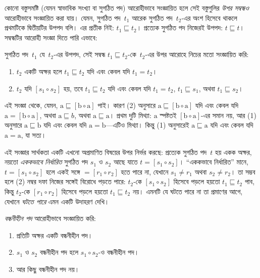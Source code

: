 \documentclass[../../../include/open-logic-section]{subfiles}
\begin{document}


কোনো বস্তুসমষ্টি (যেমন স্বাভাবিক সংখ্যা বা সুগঠিত পদ)
আরোহীভাবে সংজ্ঞায়িত হলে সেই বস্তুগুলির \emph{উপর সম্বন্ধও}
আরোহীভাবে সংজ্ঞায়িত করা যায়। যেমন, সুগঠিত পদ~$t_1$
আরেক সুগঠিত পদ~$t_2$-এর অংশ হিসেবে থাকলে প্রথমটিকে
দ্বিতীয়টির উপপদ বলি। এর প্রতীক নিই: $t_1 \sqsubseteq t_2$।
প্রত্যেক সুগঠিত পদ নিজেরই উপপদ: $t \sqsubseteq t$।
সম্বন্ধটির আরোহী সংজ্ঞা দিতে পারি এভাবে:

\begin{defn}
  সুগঠিত পদ~$t_1$ যে~$t_2$-এর উপপদ, সেই সম্বন্ধ
  $t_1 \sqsubseteq t_2$-কে~$t_2$-এর উপর আরোহে
  নিচের মতো সংজ্ঞায়িত করি:
  \begin{enumerate}
  \item $t_2$ একটি অক্ষর হলে $t_1 \sqsubseteq t_2$
    যদি এবং কেবল যদি $t_1 = t_2$।
  \item $t_2$ যদি $[s_1 \circ s_2]$ হয়, তবে
    $t_1 \sqsubseteq t_2$ যদি এবং কেবল যদি $t_1 =
    t_2$, $t_1 \sqsubseteq s_1$, অথবা $t_1 \sqsubseteq s_2$।
  \end{enumerate}
\end{defn}

এই সংজ্ঞা থেকে, যেমন, $\mathrm{a}
\sqsubseteq [\mathrm{b} \circ \mathrm{a}]$ পাই। কারণ
(2) অনুসারে $\mathrm{a} \sqsubseteq [\mathrm{b} \circ
\mathrm{a}]$ যদি এবং কেবল যদি $\mathrm{a}
= [\mathrm{b} \circ \mathrm{a}]$, অথবা $\mathrm{a}
\sqsubseteq b$, অথবা $\mathrm{a} \sqsubseteq \mathrm{a}$।
প্রথম দুটি মিথ্যা: $\mathrm{a}$ স্পষ্টতই $[\mathrm{b}
\circ \mathrm{a}]$-এর সমান নয়, আর (1) অনুসারে
$\mathrm{a} \sqsubseteq \mathrm{b}$ যদি এবং কেবল যদি
$\mathrm{a} = \mathrm{b}$—এটিও মিথ্যা। কিন্তু (1) অনুসারেই
$\mathrm{a} \sqsubseteq \mathrm{a}$ যদি এবং কেবল যদি
$\mathrm{a} = \mathrm{a}$, যা সত্য।

এই সংজ্ঞার সার্থকতা একটি এখনো অপ্রমাণিত বিষয়ের উপর
নির্ভর করছে: প্রত্যেক সুগঠিত পদ~$t$ হয় একক অক্ষর,
নয়তো \emph{এককভাবে নির্ধারিত} সুগঠিত পদ $s_1$ ও $s_2$
আছে যাতে $t = [s_1 \circ s_2]$। ``এককভাবে নির্ধারিত''
মানে, $t = [s_1 \circ s_2]$ হলে একই সঙ্গে
$= [r_1 \circ r_2]$ হতে পারে না, যেখানে $s_1 \neq r_1$
অথবা $s_2 \neq r_2$। তা সম্ভব হলে (2) নম্বর দফা
নিজের সঙ্গেই বিরোধে পড়তে পারে: $t_2$-কে
$[s_1 \circ s_2]$ হিসেবে পড়লে হয়তো $t_1
\sqsubseteq t_2$ পাব, কিন্তু $t_2$-কে $[r_1 \circ r_2]$
হিসেবে পড়লে হয়তো $t_1 \sqsubseteq t_2$ নয়।
এমনটি যে ঘটতে পারে না তা প্রমাণের আগে, যেখানে
\emph{ঘটতে পারে} এমন একটি উদাহরণ দেখি।

\begin{defn}
  \emph{বন্ধনীহীন পদ} আরোহীভাবে সংজ্ঞায়িত করি:
  \begin{enumerate}
  \item প্রতিটি অক্ষর একটি বন্ধনীহীন পদ।
    \item $s_1$ ও $s_2$ বন্ধনীহীন পদ হলে $s_1 \circ s_2$-ও
      বন্ধনীহীন পদ।
    \item আর কিছু বন্ধনীহীন পদ নয়।
  \end{enumerate}
\end{defn}
\end{document}
